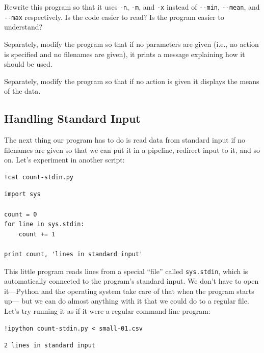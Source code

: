 \documentclass{book}
\begin{document}
\begin{swcenumerate}
\item
  Rewrite this program so that it uses \texttt{-n}, \texttt{-m}, and
  \texttt{-x} instead of \texttt{-{}-min}, \texttt{-{}-mean}, and
  \texttt{-{}-max} respectively. Is the code easier to read? Is the
  program easier to understand?
\item
  Separately, modify the program so that if no parameters are given
  (i.e., no action is specified and no filenames are given), it prints a
  message explaining how it should be used.
\item
  Separately, modify the program so that if no action is given it
  displays the means of the data.
\end{swcenumerate}

\subsection{Handling Standard Input}

The next thing our program has to do is read data from standard input if
no filenames are given so that we can put it in a pipeline, redirect
input to it, and so on. Let's experiment in another script:

\begin{verbatim}
!cat count-stdin.py
\end{verbatim}

\begin{verbatim}
import sys

count = 0
for line in sys.stdin:
    count += 1

print count, 'lines in standard input'
\end{verbatim}

This little program reads lines from a special ``file'' called
\texttt{sys.stdin}, which is automatically connected to the program's
standard input. We don't have to open it---Python and the operating
system take care of that when the program starts up--- but we can do
almost anything with it that we could do to a regular file. Let's try
running it as if it were a regular command-line program:

\begin{verbatim}
!ipython count-stdin.py < small-01.csv
\end{verbatim}

\begin{verbatim}
2 lines in standard input
\end{verbatim}
\end{document}
